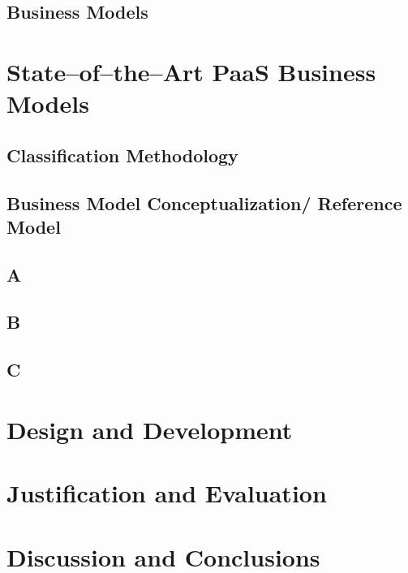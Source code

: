 	\section{Business Models}

\chapter{State--of--the--Art PaaS Business Models}

	\section{Classification Methodology}

	\section{Business Model Conceptualization/ Reference Model}
	
	\section{A}
	\section{B}
	\section{C}

\chapter{Design and Development}

\chapter{Justification and Evaluation}

\chapter{Discussion and Conclusions}


